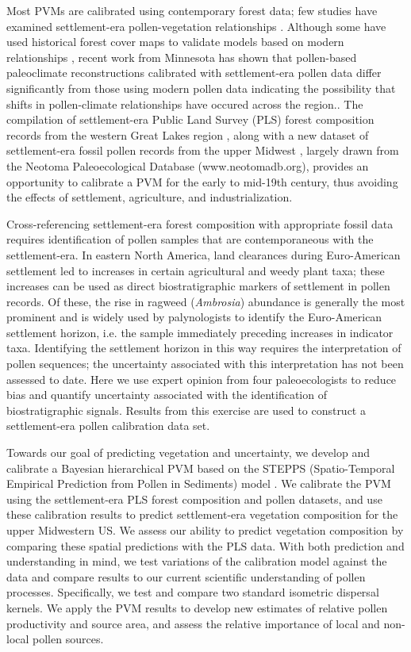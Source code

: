 \documentclass[12pt]{article}
\begin{document}
Most PVMs are calibrated using contemporary forest data; few studies
have examined settlement-era pollen-vegetation relationships
\citep{schwartz1989predicting}. Although some have used historical
forest cover maps to validate models based on modern relationships
\citep{nielsen2004modelling}, recent work from Minnesota has shown
that pollen-based paleoclimate reconstructions calibrated with
settlement-era pollen data differ significantly from those using
modern pollen data \citep{st2014bias} indicating the possibility that
shifts in pollen-climate relationships have occured across the
region.. The compilation of settlement-era Public Land Survey (PLS)
forest composition records from the western Great Lakes region
\citep{bourdo1956review, schulte2001original,
  almendinger1996minnesota, liu2011broadscale, goring_witness}, along
with a new dataset of settlement-era fossil pollen records from the
upper Midwest \citep{kujawa2015}, largely drawn from the Neotoma
Paleoecological Database (www.neotomadb.org), provides an opportunity
to calibrate a PVM for the early to mid-19th century, thus avoiding
the effects of settlement, agriculture, and industrialization.

Cross-referencing settlement-era forest composition with appropriate
fossil data requires identification of pollen samples that are
contemporaneous with the settlement-era.  In eastern North America,
land clearances during Euro-American settlement led to increases in
certain agricultural and weedy plant taxa; these increases can be used
as direct biostratigraphic markers of settlement in pollen records. Of
these, the rise in ragweed (\textit{Ambrosia}) abundance is generally
the most prominent \citep{mcandrews1988human} and is widely used by
palynologists to identify the Euro-American settlement horizon,
i.e. the sample immediately preceding increases in indicator
taxa. Identifying the settlement horizon in this way requires the
interpretation of pollen sequences; the uncertainty associated with
this interpretation has not been assessed to date. Here we use expert
opinion from four paleoecologists to reduce bias and quantify
uncertainty associated with the identification of biostratigraphic
signals. Results from this exercise are used to construct a
settlement-era pollen calibration data set.

Towards our goal of predicting vegetation and uncertainty, we develop
and calibrate a Bayesian hierarchical PVM based on the STEPPS
(Spatio-Temporal Empirical Prediction from Pollen in Sediments) model
\citep{paciorek2009mapping}. We calibrate the PVM using the
settlement-era PLS forest composition and pollen datasets, and use
these calibration results to predict settlement-era vegetation
composition for the upper Midwestern US. We assess our ability to
predict vegetation composition by comparing these spatial predictions
with the PLS data. With both prediction and understanding in mind, we
test variations of the calibration model against the data and compare
results to our current scientific understanding of pollen
processes. Specifically, we test and compare two standard isometric
dispersal kernels. We apply the PVM results to develop new estimates
of relative pollen productivity and source area, and assess the
relative importance of local and non-local pollen sources.
\end{document}
